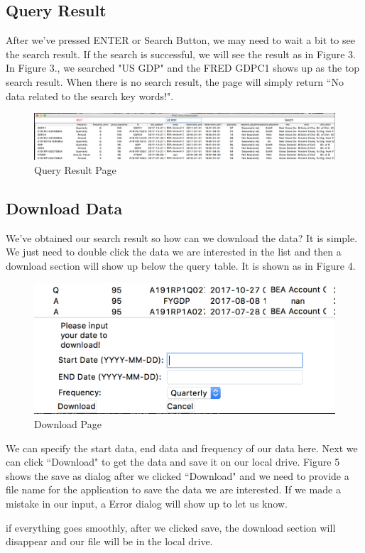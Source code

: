 \documentclass[final,12pt]{elsarticle}
\begin{document}
\subsection{Query Result}
After we've pressed ENTER or Search Button, we may need to wait a bit to see the search result. If the search is successful, we will see the result as in Figure 3. In Figure 3., we searched "US GDP" and the FRED GDPC1 shows up as the top search result. When there is no search result, the page will simply return ``No data related to the search key words!".
\begin{figure}[h]
\centering\includegraphics[width=1\linewidth]{img/query_result.png}
\caption{Query Result Page}
\end{figure}

\subsection{Download Data}
We've obtained our search result so how can we download the data? It is simple. We just need to double click the data we are interested in the list and then a download section will show up below the query table. It is shown as in Figure 4.

\begin{figure}[h]
\centering\includegraphics[width=0.5\linewidth]{img/download_page.png}
\caption{Download Page}
\end{figure}

We can specify the start data, end data and frequency of our data here. Next we can click ``Download" to get the data and save it on our local drive. Figure 5 shows the save as dialog after we clicked ``Download" and we need to provide a file name for the application to save the data we are interested. If we made a mistake in our input, a Error dialog will show up to let us know. 

if everything goes smoothly, after we clicked save, the download section will disappear and our file will be in the local drive. 
\end{document}
